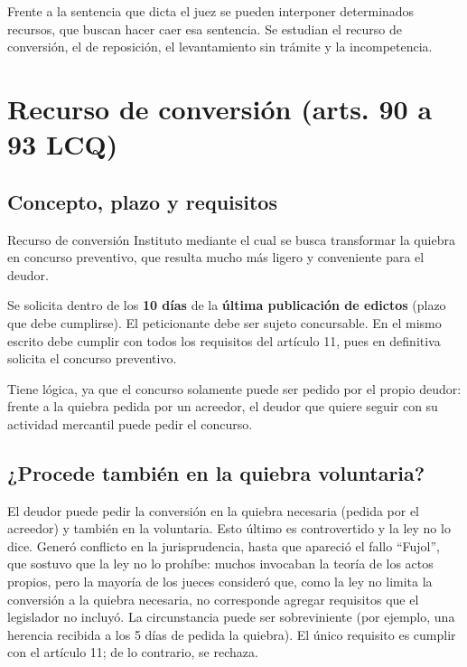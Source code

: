 \documentclass[12pt,oneside]{book}
\begin{document}
Frente a la sentencia que dicta el juez se pueden interponer determinados recursos, que buscan hacer caer esa sentencia. Se estudian el recurso de conversión, el de reposición, el levantamiento sin trámite y la incompetencia.

\section{Recurso de conversión (arts. 90 a 93 LCQ)}

\subsection{Concepto, plazo y requisitos}

\begin{definition}{Recurso de conversión}
Instituto mediante el cual se busca transformar la quiebra en concurso preventivo, que resulta mucho más ligero y conveniente para el deudor.
\end{definition}

Se solicita dentro de los \textbf{10 días} de la \textbf{última publicación de edictos} (plazo que debe cumplirse). El peticionante debe ser sujeto concursable. En el mismo escrito debe cumplir con todos los requisitos del artículo 11, pues en definitiva solicita el concurso preventivo.

Tiene lógica, ya que el concurso solamente puede ser pedido por el propio deudor: frente a la quiebra pedida por un acreedor, el deudor que quiere seguir con su actividad mercantil puede pedir el concurso.

\subsection{¿Procede también en la quiebra voluntaria?}

El deudor puede pedir la conversión en la quiebra necesaria (pedida por el acreedor) y también en la voluntaria. Esto último es controvertido y la ley no lo dice. Generó conflicto en la jurisprudencia, hasta que apareció el fallo ``Fujol'', que sostuvo que la ley no lo prohíbe: muchos invocaban la teoría de los actos propios, pero la mayoría de los jueces consideró que, como la ley no limita la conversión a la quiebra necesaria, no corresponde agregar requisitos que el legislador no incluyó. La circunstancia puede ser sobreviniente (por ejemplo, una herencia recibida a los 5 días de pedida la quiebra). El único requisito es cumplir con el artículo 11; de lo contrario, se rechaza.
\end{document}
